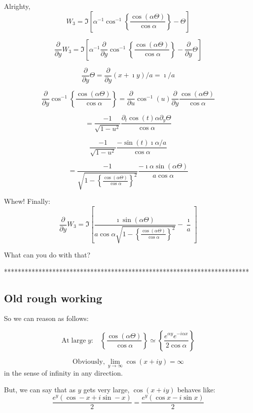 \documentclass[a4paper]{report}
\begin{document}
Alrighty,
\[ W_{3} = \Im \left[  
 \alpha^{-1} \cos^{-1} 
 \left\{ \frac{\cos(\alpha \Theta)}{\cos \alpha} \right\} - \Theta
   \right] \]

\[ \frac{\partial}{\partial y} W_{3} = \Im \left[  
 \alpha^{-1}  \frac{\partial}{\partial y}  \cos^{-1} 
 \left\{ \frac{\cos(\alpha \Theta)}{\cos \alpha} \right\}
  - \frac{\partial}{\partial y} \Theta
   \right] \]

\[ \frac{\partial}{\partial y} \Theta = \frac{\partial}{\partial y} (x + \imath y)/a
    = \imath / a  \]
    
\[ \frac{\partial}{\partial y}  \cos^{-1} 
 \left\{ \frac{\cos(\alpha \Theta)}{\cos \alpha} \right\}
 = \frac{\partial}{\partial u} \cos^{-1}( u ) 
   \frac{\partial}{\partial y}  \frac{\cos(\alpha \Theta)}{\cos \alpha} \]

\[ = \frac{-1}{\sqrt{1-u^{2}}}  \frac{ \partial_{t} \cos(t) \alpha \partial_{y} \Theta}{\cos \alpha}  \]

\[  \frac{-1}{\sqrt{1-u^{2}}}  \frac{-\sin(t) \imath \alpha/a}{\cos \alpha} \]

\[ =  \frac{-1}{\sqrt{1-
\left\{ \frac{\cos(\alpha \Theta)}{\cos \alpha} \right\}^{2}}} 
     \frac{- \imath \alpha \sin(\alpha \Theta)}{a \cos \alpha} \]
     
Whew! Finally:
\[ \frac{\partial}{\partial y} W_{3} = \Im \left[  
\frac{\imath \sin(\alpha \Theta)}
{ a \cos \alpha
\sqrt{1- \left\{ \frac{\cos(\alpha \Theta)}{\cos \alpha} \right\}^{2}}} 
 - \frac{\imath}{a}   \right] \]

What can you do with that?

\pagebreak

***********************************************************************
\subsection*{Old rough working}

So we can reason as follows:

\[ \mathrm{At \; large \; }y: \;\;\; \left\{ \frac{\cos(\alpha \Theta)}{\cos \alpha} \right\}
\simeq
\left\{ \frac{e^{\alpha y} e^{- i \alpha x}}{2 \cos \alpha} \right\}  \]

\[ \mathrm{Obviously,} \lim_{y \rightarrow \infty} \cos (x + iy) = \infty \]
in the sense of infinity in any direction.

But, we can say that as $y$ gets very large, $\cos (x+iy)$ behaves like:
\[ \frac{e^{y}(\cos -x + i\sin -x)}{2} = \frac{e^{y}(\cos x - i\sin x)}{2} \]
\end{document}
